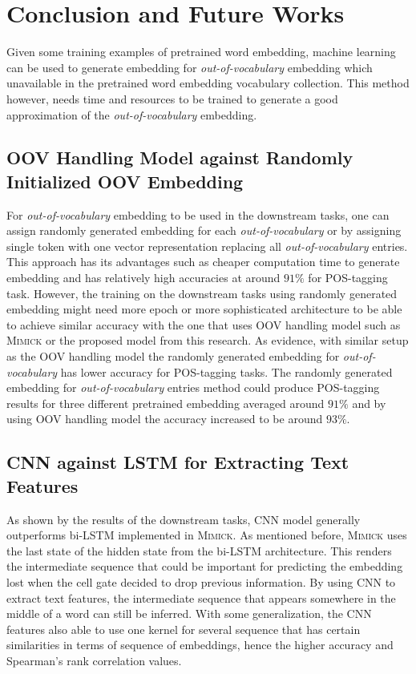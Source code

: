 \chapter{Conclusion and Future Works}
\label{chap:conc}

Given some training examples of pretrained word embedding, machine
learning can be used to generate embedding for
\textit{out-of-vocabulary} embedding which unavailable in the
pretrained word embedding vocabulary collection. This method however,
needs time and resources to be trained to generate a good
approximation of the \textit{out-of-vocabulary} embedding.

\section{OOV Handling Model against Randomly Initialized OOV Embedding}
For \textit{out-of-vocabulary} embedding to be used in the downstream
tasks, one can assign randomly generated embedding for each
\textit{out-of-vocabulary} or by assigning single token with one
vector representation replacing all \textit{out-of-vocabulary}
entries. This approach has its advantages such as cheaper computation time
to generate embedding and has relatively high accuracies at around
$91\%$ for POS-tagging task. However, the training on the downstream
tasks using randomly generated embedding might need more epoch or more
sophisticated architecture to be able to achieve similar accuracy with the one that
uses OOV handling model such as \textsc{Mimick} or the proposed model
from this research. As evidence, with similar setup as the OOV
handling model the randomly generated embedding for
\textit{out-of-vocabulary} has lower accuracy for POS-tagging tasks.
The randomly generated embedding for \textit{out-of-vocabulary}
entries method could produce POS-tagging results for three different
pretrained embedding averaged around $91\%$ and by using OOV handling
model the accuracy increased to be around $93\%$.

\section{CNN against LSTM for Extracting Text Features}
As shown by the results of the downstream tasks, CNN model generally
outperforms bi-LSTM implemented in \textsc{Mimick}. As mentioned before,
\textsc{Mimick} uses the last state of the hidden state from the
bi-LSTM architecture. This renders the intermediate sequence that
could be important for predicting the embedding lost when the cell
gate decided to drop previous information. By using CNN to extract
text features, the intermediate sequence that appears somewhere in the
middle of a word can still be inferred. With some generalization, the
CNN features also able to use one kernel for several sequence that has
certain similarities in terms of sequence of embeddings, hence the
higher accuracy and Spearman's rank correlation values.

